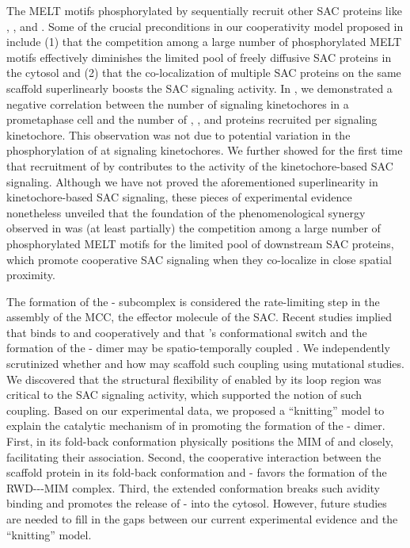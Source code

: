 The MELT motifs phosphorylated by  sequentially recruit other SAC proteins like , , and  \cite{Ji2017eLife}. Some of the crucial preconditions in our cooperativity model proposed in  include (1) that the competition among a large number of phosphorylated MELT motifs effectively diminishes the limited pool of freely diffusive SAC proteins in the cytosol and (2) that the co-localization of multiple SAC proteins on the same  scaffold superlinearly boosts the SAC signaling activity. In , we demonstrated a negative correlation between the number of signaling kinetochores in a prometaphase cell and the number of , , and  proteins recruited per signaling kinetochore. This observation was not due to potential variation in the phosphorylation of  at signaling kinetochores. We further showed for the first time that recruitment of  by   contributes to the activity of the kinetochore-based SAC signaling. Although we have not proved the aforementioned superlinearity in kinetochore-based SAC signaling, these pieces of experimental evidence nonetheless unveiled that the foundation of the phenomenological synergy observed in  was (at least partially) the competition among a large number of phosphorylated MELT motifs for the limited pool of downstream SAC proteins, which promote cooperative SAC signaling when they co-localize in close spatial proximity.

The formation of the - subcomplex is considered the rate-limiting step in the assembly of the MCC, the effector molecule of the SAC. Recent studies implied that  binds to  and  cooperatively and that 's conformational switch and the formation of the - dimer may be spatio-temporally coupled \cite{BUB1-CDC20-MAD1, Tripartite}. We independently scrutinized whether and how  may scaffold such coupling using mutational studies. We discovered that the structural flexibility of  enabled by its loop region was critical to the SAC signaling activity, which supported the notion of such coupling. Based on our experimental data, we proposed a ``knitting'' model to explain the catalytic mechanism of  in promoting the formation of the - dimer. First,  in its fold-back conformation physically positions the MIM of  and  closely, facilitating their association. Second, the cooperative interaction between the scaffold protein  in its fold-back conformation and - favors the formation of the RWD---MIM complex. Third, the extended conformation breaks such avidity binding and promotes the release of - into the cytosol. However, future studies are needed to fill in the gaps between our current experimental evidence and the ``knitting'' model.

